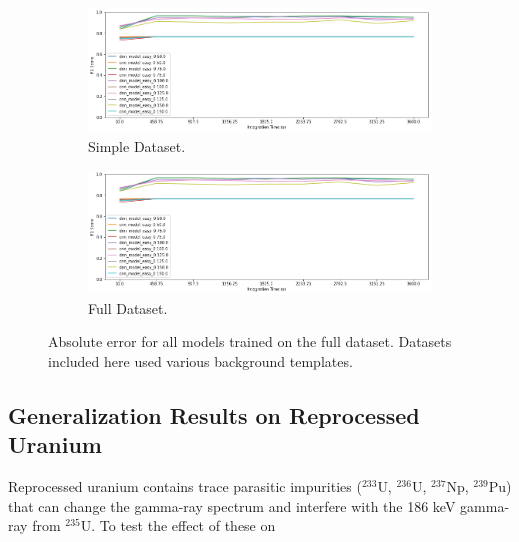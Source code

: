 \begin{figure}[H]
     \centering
     \begin{subfigure}[b]{0.9\textwidth}
         \centering
         \includegraphics[width=\textwidth]{images/results_easy_distance_comparison}
         \caption{Simple Dataset.}
         \label{fig:results_full_background_inject_simple}
     \end{subfigure}

     \begin{subfigure}[b]{0.9\textwidth}
         \centering
         \includegraphics[width=\textwidth]{images/results_easy_distance_comparison}
         \caption{Full Dataset.}
         \label{fig:results_full_background_inject_full}
     \end{subfigure}
        \caption{Absolute error for all models trained on the full dataset. Datasets included here used various background templates.}
        \label{fig:results_full_background_inject}
\end{figure}


\subsection{Generalization Results on Reprocessed Uranium}

Reprocessed uranium contains trace parasitic impurities ($^{233}$U, $^{236}$U, $^{237}$Np, $^{239}$Pu) that can change the gamma-ray spectrum and interfere with the 186 keV gamma-ray from $^{235}$U. To test the effect of these on 


